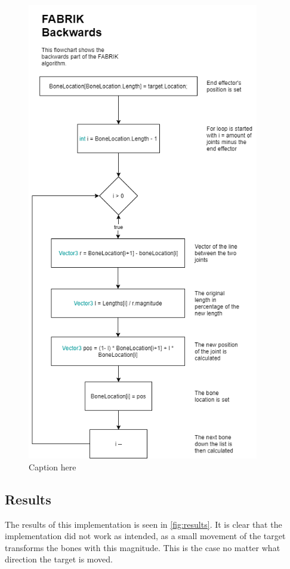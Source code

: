 \begin{figure}[H]
\centering
\includegraphics[width=0.9\textwidth]{FABRIK/Flowchart.png}
\caption{Caption here}
\label{fig:flow}
\end{figure}

\subsection{Results}

The results of this implementation is seen in \autoref{fig:results}. It is clear that the implementation did not work as intended, as a small movement of the target transforms the bones with this magnitude. This is the case no matter what direction the target is moved. 


